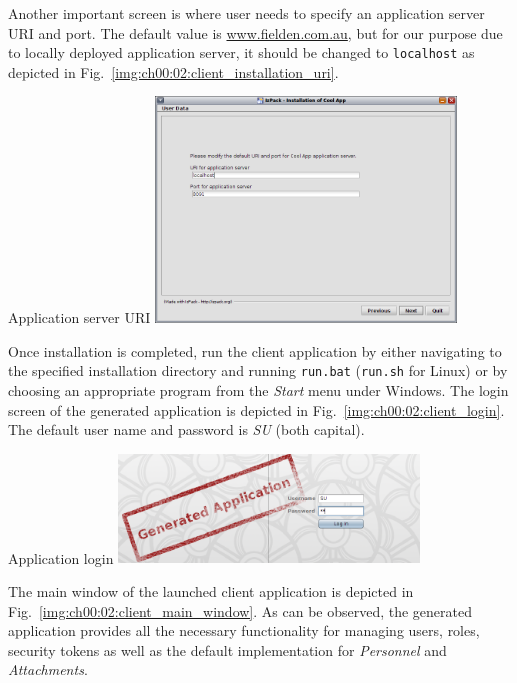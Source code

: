   Another important screen is where user needs to specify an application server URI and port.
  The default value is \url{www.fielden.com.au}, but for our purpose due to locally deployed application server, it should be changed to \texttt{localhost} as depicted in Fig.~\ref{img:ch00:02:client_installation_uri}.

  \begin{image}{Application server URI}{\label{img:ch00:02:client_installation_uri}}    
    \includegraphics[width=0.6\textwidth]{parts/00-part/chapters/01-application-modules/images/03-client-installation-uri.png}
  \end{image}
  
  Once installation is completed, run the client application by either navigating to the specified installation directory and running \texttt{run.bat} (\texttt{run.sh} for Linux) or by choosing an appropriate program from the \emph{Start} menu under Windows.
  The login screen of the generated application is depicted in Fig.~\ref{img:ch00:02:client_login}.
  The default user name and password is \emph{SU} (both capital).

  \begin{image}{Application login}{\label{img:ch00:02:client_login}}    
    \includegraphics[width=0.6\textwidth]{parts/00-part/chapters/01-application-modules/images/04-client-login.png}
  \end{image}

  The main window of the launched client application is depicted in Fig.~\ref{img:ch00:02:client_main_window}.
  As can be observed, the generated application provides all the necessary functionality for managing users, roles, security tokens as well as the default implementation for \emph{Personnel} and \emph{Attachments}.

